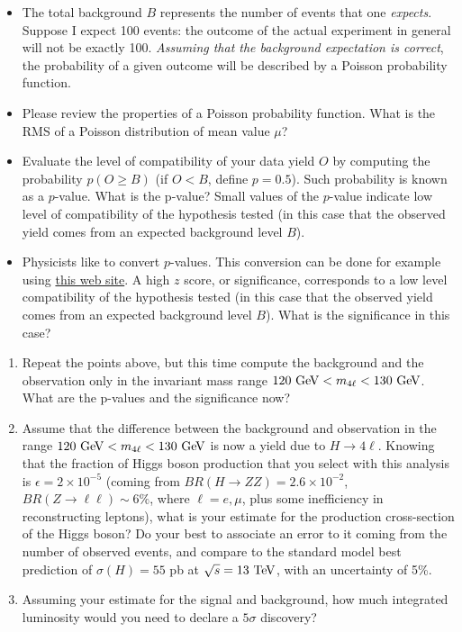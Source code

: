 \begin{exercise}
\begin{itemize} 
\item The total background $B$ represents the number of events that one \textit{expects}. Suppose I expect 100 events: the outcome of the actual experiment in general will not be exactly 100. \textit{Assuming that the background expectation is correct}, the probability of a given outcome will be described by a Poisson probability function. 
\item Please review the properties of a Poisson probability function. What is the RMS of a Poisson distribution of mean value $\mu$?
\item Evaluate the level of compatibility of your data yield $O$ by computing the probability $p(O \ge B)$ (if $O<B$, define $p = 0.5$). Such probability is known as a $p$-value. What is the p-value? Small values of the $p$-value indicate low level of compatibility of the hypothesis tested (in this case that the observed yield comes from an expected background level $B$). 
\item Physicists like to convert $p$-values. This conversion can be done for example using \href{https://planetcalc.com/7803/}{this web site}. A high $z$ score, or significance, corresponds to a low level  compatibility of the hypothesis tested (in this case that the observed yield comes from an expected background level $B$). What is the significance in this case?
\end{itemize}
\end{exercise}

\begin{enumerate}[resume]
\item Repeat the points above, but this time compute the background and the observation only in the invariant mass range $120\ \text{Ge\kern -0.1em V} < m_{4\ell} < 130\ \text{Ge\kern -0.1em V}$. What are the p-values and the significance now? 
\item Assume that the difference between the background and observation in the range  $120\ \text{Ge\kern -0.1em V} < m_{4\ell} < 130\ \text{Ge\kern -0.1em V}$ is now a yield due to $H \rightarrow 4\ell$. Knowing that the fraction of Higgs boson production that you select with this analysis is $\epsilon = 2 \times 10^{-5}$ (coming from $BR(H\rightarrow ZZ)=2.6\times 10^{-2}$, $BR(Z\rightarrow \ell\ell) \sim 6\%$, where $\ell = e, \mu$, plus some inefficiency in reconstructing leptons), what is your estimate for the production cross-section of the Higgs boson? Do your best to associate an error to it coming from the number of observed events, and compare to the standard model best prediction of $\sigma(H) = 55$ pb at $\sqrt{s} = 13\ \text{Te\kern -0.1em V}$, with an uncertainty of 5\%. 
\item Assuming your estimate for the signal and background, how much integrated luminosity would you need to declare a $5\sigma$ discovery?
\end{enumerate}

